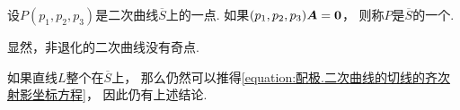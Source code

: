 设\(P(p_1,p_2,p_3)\)是二次曲线\(\overline{S}\)上的一点.
如果\((p_1,p_2,p_3) \boldsymbol{A} = \boldsymbol0\)，
则称\(P\)是\(\overline{S}\)的一个.

显然，非退化的二次曲线没有奇点.

如果直线\(L\)整个在\(\overline{S}\)上，
那么仍然可以推得\cref{equation:配极.二次曲线的切线的齐次射影坐标方程}，
因此仍有上述结论.
